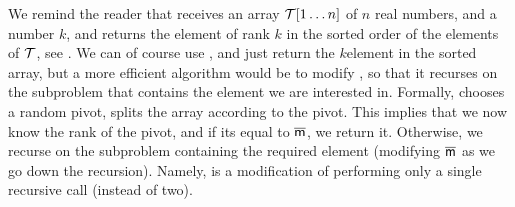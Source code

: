 


We remind the reader that \QuickSelect receives an array
$\mathcal{T}[1\ldots n]$ of $n$ real numbers, and a number $k$, and returns the
element of rank $k$ in the sorted order of the elements of $\mathcal{T}$, see
.  We can of course use \QuickSort, and just return
the $k$\th element in the sorted array, but a more efficient algorithm
would be to modify \QuickSelect, so that it recurses on the subproblem
that contains the element we are interested in. Formally, \QuickSelect
chooses a random pivot, splits the array according to the pivot. This
implies that we now know the rank of the pivot, and if its equal to
$\overline{\mathsf{m}}$, we return it. Otherwise, we recurse on the subproblem
containing the required element (modifying $\overline{\mathsf{m}}$ as we go down the
recursion).  Namely, \QuickSelect is a modification of \QuickSort
performing only a single recursive call (instead of two).


